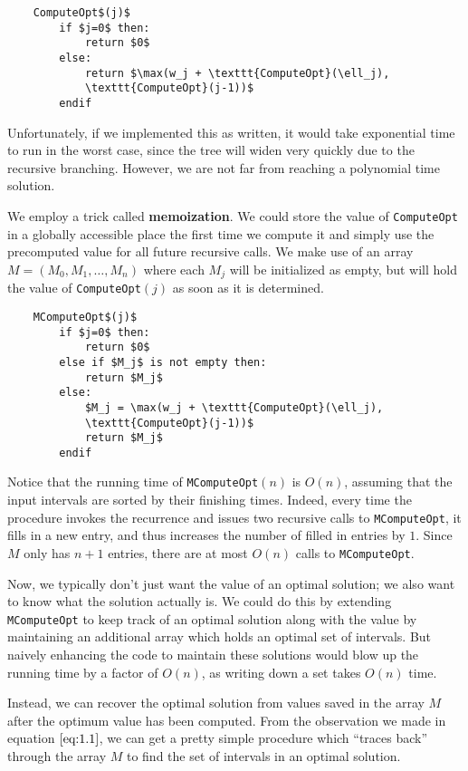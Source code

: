 \begin{lstlisting}
    ComputeOpt$(j)$
        if $j=0$ then:
            return $0$
        else: 
            return $\max(w_j + \texttt{ComputeOpt}(\ell_j), 
            \texttt{ComputeOpt}(j-1))$
        endif
\end{lstlisting}

\newpage 
Unfortunately, if we implemented this as written, it would take exponential
time to run in the worst case, since the tree will widen very quickly 
due to the recursive branching. However, we are not far from reaching a 
polynomial time solution. 

We employ a trick called {\bf memoization}. We could store the value of 
\texttt{ComputeOpt} in a globally accessible place the first time we compute 
it and simply use the precomputed value for all future recursive calls. 
We make use of an array $M = (M_0, M_1, \dots, M_n)$ where each $M_j$ 
will be initialized as empty, but will hold the value of \texttt{ComputeOpt}$(j)$
as soon as it is determined. 

\begin{lstlisting}
    MComputeOpt$(j)$
        if $j=0$ then:
            return $0$
        else if $M_j$ is not empty then:
            return $M_j$
        else:
            $M_j = \max(w_j + \texttt{ComputeOpt}(\ell_j), 
            \texttt{ComputeOpt}(j-1))$
            return $M_j$
        endif
\end{lstlisting}

Notice that the running time of \texttt{MComputeOpt}$(n)$ is $O(n)$, assuming 
that the input intervals are sorted by their finishing times. Indeed, 
every time the procedure invokes the recurrence and issues two recursive 
calls to \texttt{MComputeOpt}, it fills in a new entry, and thus increases 
the number of filled in entries by $1$. Since $M$ only has $n+1$ entries, 
there are at most $O(n)$ calls to \texttt{MComputeOpt}.

Now, we typically don't just want the value of an optimal solution; we 
also want to know what the solution actually is. We could do this by 
extending \texttt{MComputeOpt} to keep track of an optimal solution 
along with the value by maintaining an additional array which holds an 
optimal set of intervals. But naively enhancing the code to maintain these 
solutions would blow up the running time by a factor of $O(n)$, as writing 
down a set takes $O(n)$ time. 

Instead, we can recover the optimal solution from values saved in the array 
$M$ after the optimum value has been computed. From the observation we made 
in equation $\eqref{eq:1.1}$, we can get a pretty simple procedure which 
``traces back'' through the array $M$ to find the set of intervals in an 
optimal solution. 


